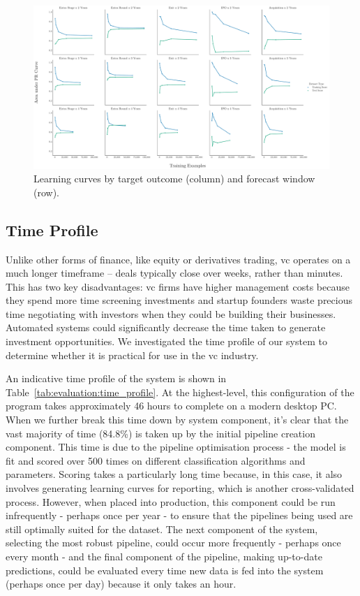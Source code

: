 \documentclass[../thesis/thesis.tex]{subfiles}
\begin{document}
\begin{figure}[!htb]
    \centering
    \includegraphics[width=\textwidth]{../figures/evaluation/learning_curves_outcome}
    \caption[Learning curves by target outcome]{Learning curves by target outcome (column) and forecast window (row).}
    \label{fig:evaluation:learning_outcome_window}
\end{figure}

\subsection{Time Profile}

Unlike other forms of finance, like equity or derivatives trading, \gls{vc} operates on a much longer timeframe -- deals typically close over weeks, rather than minutes. This has two key disadvantages: \gls{vc} firms have higher management costs because they spend more time screening investments and startup founders waste precious time negotiating with investors when they could be building their businesses. Automated systems could significantly decrease the time taken to generate investment opportunities. We investigated the time profile of our system to determine whether it is practical for use in the \gls{vc} industry.

An indicative time profile of the system is shown in Table~\ref{tab:evaluation:time_profile}. At the highest-level, this configuration of the program takes approximately 46 hours to complete on a modern desktop PC. When we further break this time down by system component, it's clear that the vast majority of time (84.8\%) is taken up by the initial pipeline creation component. This time is due to the pipeline optimisation process - the model is fit and scored over 500 times on different classification algorithms and parameters. Scoring takes a particularly long time because, in this case, it also involves generating learning curves for reporting, which is another cross-validated process. However, when placed into production, this component could be run infrequently - perhaps once per year - to ensure that the pipelines being used are still optimally suited for the dataset. The next component of the system, selecting the most robust pipeline, could occur more frequently - perhaps once every month - and the final component of the pipeline, making up-to-date predictions, could be evaluated every time new data is fed into the system (perhaps once per day) because it only takes an hour.
\end{document}
